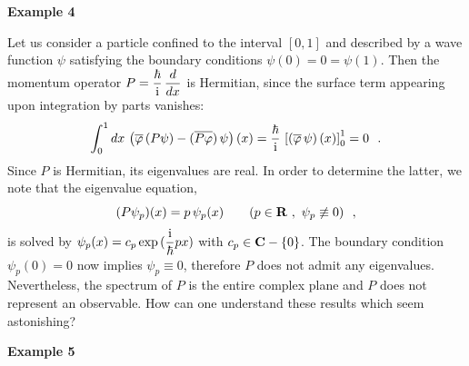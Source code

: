 \documentclass[a4wide,12pt]{report}
\begin{document}
\bigskip



\noindent 
{\bf Example 4}
 
\medskip

Let us consider a particle confined to the interval
$[0,1]$ and described by a wave function $\psi$
satisfying the boundary conditions $\psi(0) =0=\psi(1)$.
Then the momentum operator $P=\displaystyle{\hbar \over {\rm i}} \,
\displaystyle{d \over dx}$ is Hermitian, since the surface term
appearing upon integration by parts vanishes:
\begin{equation}
\label{itg}
\int_0^1 dx \, \left( \overline{\varphi} \,
(P\psi) -
(\overline{P\varphi} ) \, \psi \right) (x)
=
\displaystyle{\hbar \over {\rm i}} \, \left[ \left(
\overline{\varphi} \, \psi \right) (x) \right] _{0}^{1} = 0
\ \ .
\end{equation}
Since $P$ is Hermitian, its eigenvalues are real.
In order to determine the latter, we note that the
eigenvalue equation,
\[
(P \psi_p)(x) = p \,  \psi_p(x)
\qquad (p \in {\bf R} \ , \ \psi_p \not \equiv 0)
\ \ ,
\]
is solved by
$\psi_p (x)= c_p \, {\rm exp} \, ( \displaystyle{{\rm i}\over \hbar} px )$ 
with $c_p \in {\bf C} - \{ 0 \}$.
The boundary condition $\psi_p (0) =0$ now implies
$\psi_p \equiv 0$, therefore $P$ does not admit any eigenvalues.
Nevertheless, the spectrum
of $P$ is the entire complex plane  \cite{sg}
and $P$ does not represent an observable.
How can one understand these results
which seem astonishing?
 
 
\bigskip
 
\noindent 
{\bf Example 5}
 
\medskip
\end{document}
